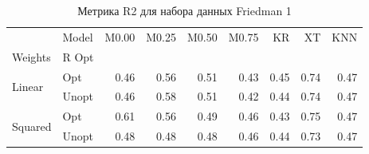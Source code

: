\begin{table}
\caption{Метрика R2 для набора данных Friedman 1}
\label{tab:R2_Friedman 1}
\begin{tabular}{llrrrrrrr}
\toprule
 & Model & M0.00 & M0.25 & M0.50 & M0.75 & KR & XT & KNN \\
Weights & R Opt &  &  &  &  &  &  &  \\
\midrule
\multirow[t]{2}{*}{Linear} & Opt & 0.46 & 0.56 & 0.51 & 0.43 & 0.45 & 0.74 & 0.47 \\
 & Unopt & 0.46 & 0.58 & 0.51 & 0.42 & 0.44 & 0.74 & 0.47 \\

\multirow[t]{2}{*}{Squared} & Opt & 0.61 & 0.56 & 0.49 & 0.46 & 0.43 & 0.75 & 0.47 \\
 & Unopt & 0.48 & 0.48 & 0.48 & 0.46 & 0.44 & 0.73 & 0.47 \\

\bottomrule
\end{tabular}
\end{table}
